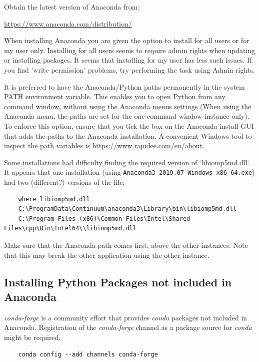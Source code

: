 Obtain the latest version of Anaconda from:

\url{https://www.anaconda.com/distribution/}


When installing Anaconda you are given the option to install for all users or for my user only.  Installing for all users seems to require admin rights when updating or installing packages. It seems that installing for my user has less such issues.  If you find 'write permission' problems, try performing the task using Admin rights.


It is preferred to have the Anaconda/Python paths permanently in the system PATH environment variable. This enables you to open Python from any command window, without using the Anaconda menus settings (When using the Anaconda menu, the paths are set for the one command window instance only).
To enforce this option, ensure that you tick the box on the Anaconda install \ac{GUI} that adds the paths to the Anaconda installation. A convenient Windows tool to inspect the path variables is \url{https://www.rapidee.com/en/about}.

Some installations had difficulty finding the required version of  `libiomp5md.dll`. It appears that one installation (using  \lstinline{Anaconda3-2019.07-Windows-x86_64.exe}) had two (different?) versions of the file:

\footnotesize
\begin{lstlisting}
    where libiomp5md.dll
    C:\ProgramData\Continuum\anaconda3\Library\bin\libiomp5md.dll
    C:\Program Files (x86)\Common Files\Intel\Shared Files\cpp\Bin\Intel64\\libiomp5md.dll
\end{lstlisting}
\normalsize
Make sure that the Anaconda path comes first, above the other instances.  Note that this may break the other application using the other instance.

\subsection{Installing Python Packages not included in Anaconda}

\textit{conda-forge} is a community effort that provides \textit{conda} packages not included in Anaconda. Registration of the \textit{conda-forge} channel as a package source for \textit{conda} might be required.

\footnotesize
\begin{lstlisting}
    conda config --add channels conda-forge
\end{lstlisting}
\normalsize

